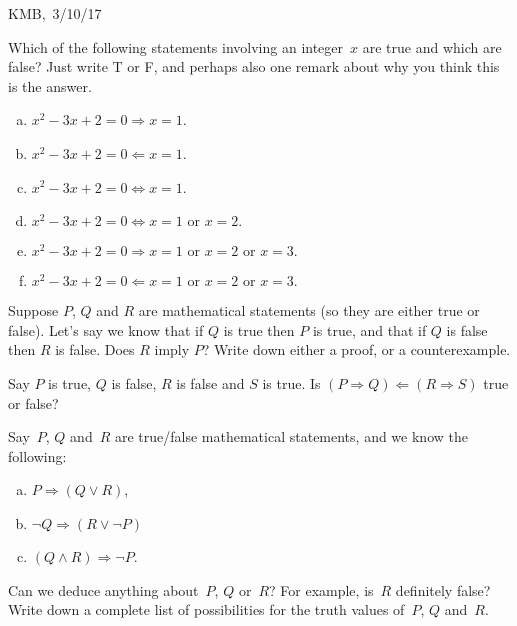 \documentclass[10pt]{article}
\begin{document}
\begin{flushright} KMB,\ 3/10/17\end{flushright}


\medskip
{} Which of the following statements involving an integer~$x$ are true and which are false? Just write T or F, and perhaps also one remark about why you think this is the answer.
\begin{multicols}{2}
\begin{enumerate}[(a)]
\item $x^2-3x+2=0\Rightarrow x=1$.
\item $x^2-3x+2=0\Leftarrow x=1$.
\item $x^2-3x+2=0\iff x=1$.
\item $x^2-3x+2=0\iff x=1\mbox{ or }x=2.$
\item $x^2-3x+2=0\Rightarrow x=1\mbox{ or }x=2\mbox{ or }x=3.$
\item $x^2-3x+2=0\Leftarrow x=1\mbox{ or }x=2\mbox{ or }x=3.$
\end{enumerate}
\end{multicols}
\medskip
{} Suppose $P$, $Q$ and $R$ are mathematical statements (so they are either true or false). Let's say we know that if $Q$ is true then $P$ is true, and that if $Q$ is false then $R$ is false. Does $R$ imply $P$? Write down either a proof, or a counterexample.

\medskip{} Say $P$ is true, $Q$ is false, $R$ is false and $S$ is true. Is $(P\Rightarrow Q)\Leftarrow(R\Rightarrow S)$ true or false?

\medskip{} Say~$P$, $Q$ and~$R$ are true/false mathematical statements, and we know the following:
\begin{enumerate}[(a)]
\item $P\Rightarrow(Q\vee R)$,
\item $\neg Q\Rightarrow (R\vee\neg P)$
\item $(Q\wedge R)\Rightarrow \neg P$.
\end{enumerate}
Can we deduce anything about~$P$, $Q$ or~$R$? For example, is~$R$ definitely false? Write down a complete list of possibilities for the truth values of~$P$, $Q$ and~$R$.
\end{document}
